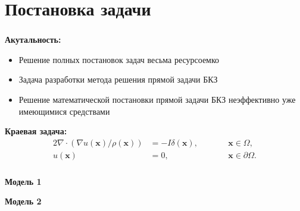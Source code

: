 

\frame[plain]{\titlepage} %


\section{Постановка задачи}

\begin{frame}
\frametitle{\insertsection}


\textbf{Акутальность:}
\begin{itemize}
\item Решение полных постановок задач весьма ресурсоемко
\item Задача разработки метода решения прямой задачи БКЗ
\item Решение математической постановки прямой задачи БКЗ неэффективно уже имеющимися средствами
\end{itemize}
\bigskip

\textbf{Краевая задача:}
\begin{alignat*}{2}
\nabla \cdot (\nabla u(\bm x) / \rho(\bm x)) &= -I \delta(\bm x),\qquad && \bm x \in \varOmega, \\
u(\bm x) &= 0, && \bm x \in \partial \varOmega.
\end{alignat*}
\end{frame}

\begin{frame}
\frametitle{\insertsection}

\begin{minipage}[t]{0.47\linewidth}
    \textbf{Модель 1}
\end{minipage}
\hfill
\begin{minipage}[t]{0.47\linewidth}
    \textbf{Модель 2}
\end{minipage}
\end{frame}

